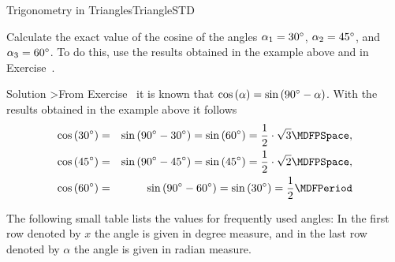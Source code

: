 \begin{MXContent}{Trigonometry in Triangles}{Triangle}{STD}
\begin{MExercise}
Calculate the exact value of the cosine of the angles $\alpha_1=30^{\circ}$, 
$\alpha_2=45^{\circ}$, and $\alpha_3=60^{\circ}$. To do this, use the results obtained 
in the example above and in Exercise~.

\begin{MHint}{Solution}
>From Exercise~ it is known  
that $\cos\left(\alpha\right)= \sin\left(90^{\circ}-\alpha\right)$.
With the results obtained in the example above it follows
\begin{eqnarray*}
\cos\left(30\MGrad\right) %
 & = & \sin\left(90\MGrad-30\MGrad\right) %
 =\sin\left(60\MGrad\right) %
 =\frac{1}{2}\cdot\sqrt{3} \MDFPSpace, \\
%
\cos\left(45\MGrad\right)
 & = & \sin\left(90\MGrad-45\MGrad\right) %
 =\sin\left(45\MGrad\right) %
 =\frac{1}{2}\cdot\sqrt{2} \MDFPSpace, \\
%
\cos\left(60\MGrad\right) %
 & = & \sin\left(90\MGrad-60\MGrad\right) %
 =\sin\left(30\MGrad\right) %
 =\frac{1}{2} \MDFPeriod \\
\end{eqnarray*}
\end{MHint}
\end{MExercise}

The following small table lists the values for frequently used angles:
In the first row denoted by $x$ the angle is given in degree measure, and 
in the last row denoted by $\alpha$ the angle is given in radian measure.


\end{MXContent}
